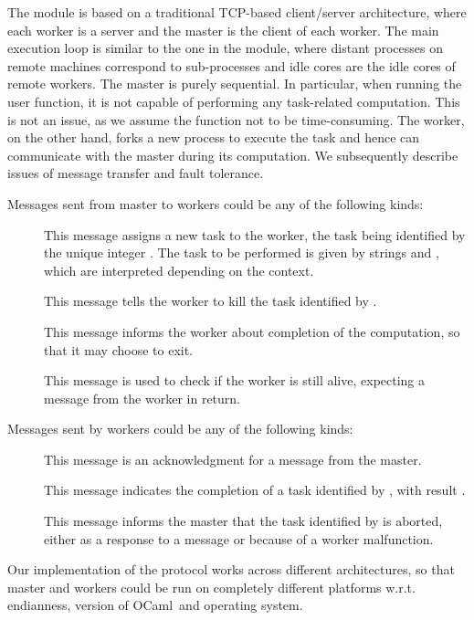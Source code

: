 \documentclass{llncs}
\newcommand{\Ocaml}{OCaml}
\begin{document}
The  module is based on a traditional TCP-based client/server
architecture, where each worker is a server and the master is the
client of each worker. The main execution loop is similar to the one
in the  module, where distant processes on remote machines
correspond to sub-processes and idle cores are the idle cores 
of remote workers. 
The master is purely sequential. In particular, when running the user
 function, it is not capable of performing any task-related
computation. This is not an issue, as we assume the 
function not to be time-consuming.
The worker, on the other hand, forks a new process to execute the task
and hence can communicate with the master during its computation.
We subsequently describe issues of message
transfer and fault tolerance.


Messages sent from master to workers could be any of the following kinds:
\begin{description}
\item[] This message assigns a
  new task to the worker, the task being identified by the unique
  integer . The task to be performed is given by strings 
  and , which are interpreted depending on the context.

\item[] This message tells the worker to kill the task
  identified by .

\item[] This message informs the worker about completion of
  the computation, so that it may choose to exit.

\item[] This message is used to check if the worker is still
  alive, expecting a  message from the worker in return.
\end{description}
Messages sent by workers could be any of the following kinds:
\begin{description}
\item[] This message is an acknowledgment for a 
  message from the master.

\item[] This message indicates the
  completion of a task identified by , with result .

\item[] This message informs the master that the
  task identified by  is aborted, either as a response to a
   message or because of a worker malfunction.
\end{description}
Our implementation of the protocol works across different
architectures, so that master and workers could be run on completely
different platforms w.r.t. endianness, version of \Ocaml\ and
operating system.
\end{document}
